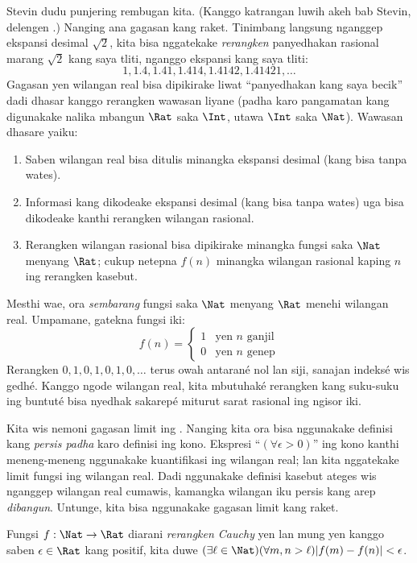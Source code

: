 \documentclass[../../../include/open-logic-section]{subfiles}
\begin{document}
Stevin dudu punjering rembugan kita. (Kanggo katrangan luwih akeh bab
Stevin, delengen \citealt{KatzKatz2012}.) Nanging ana gagasan kang raket.
Tinimbang langsung nganggep ekspansi desimal $\sqrt{2}$, kita bisa
nggatekake \emph{rerangken} panyedhakan rasional marang $\sqrt{2}$ kang
saya tliti, nganggo ekspansi kang saya tliti:
\[
1, 1.4, 1.41, 1.414, 1.4142, 1.41421,\ldots
\]
Gagasan yen wilangan real bisa dipikirake liwat ``panyedhakan kang saya
becik'' dadi dhasar kanggo rerangken wawasan liyane (padha karo pangamatan
kang digunakake nalika mbangun $\Rat$ saka $\Int$, utawa $\Int$ saka
$\Nat$). Wawasan dhasare yaiku:
\begin{enumerate}
	\item Saben wilangan real bisa ditulis minangka ekspansi desimal
	(kang bisa tanpa wates).
	\item Informasi kang dikodeake ekspansi desimal (kang bisa tanpa wates)
	uga bisa dikodeake kanthi rerangken wilangan rasional.
	\item Rerangken wilangan rasional bisa dipikirake minangka fungsi saka
	$\Nat$ menyang $\Rat$; cukup netepna $f(n)$ minangka wilangan rasional
	kaping $n$ ing rerangken kasebut.
\end{enumerate}
Mesthi wae, ora \emph{sembarang} fungsi saka $\Nat$ menyang $\Rat$ menehi
wilangan real. Umpamane, gatekna fungsi iki:
\[
	f(n) =\begin{cases}
			1 & \text{yen }n\text{ ganjil}\\
			0 &\text{yen }n\text{ genep}
		\end{cases}
\]
Rerangken $0,1,0,1,0,1,0,\ldots$ terus owah antarané nol lan siji,
sanajan indeksé wis gedhé. Kanggo ngode wilangan real, kita mbutuhaké
rerangken kang suku-suku ing buntuté bisa nyedhak sakarepé miturut
sarat rasional ing ngisor iki.

Kita wis nemoni gagasan limit ing . Nanging
kita ora bisa nggunakake definisi kang \emph{persis padha} karo definisi
ing kono. Ekspresi ``$(\forall \epsilon>0)$'' ing kono kanthi meneng-meneng
nggunakake kuantifikasi ing wilangan real; lan kita nggatekake limit fungsi
ing wilangan real. Dadi nggunakake definisi kasebut ateges wis nganggep
wilangan real cumawis, kamangka wilangan iku persis kang arep
\emph{dibangun}. Untunge, kita bisa nggunakake gagasan limit kang raket.
\begin{defn}
  Fungsi $f: \Nat \to \Rat$ diarani \emph{rerangken Cauchy} yen lan mung
  yen kanggo saben $\epsilon \in \Rat$ kang positif, kita duwe $(\exists
  \ell \in \Nat)(\forall m, n > \ell)|f(m) - f(n)| < \epsilon$.
\end{defn}
\end{document}
